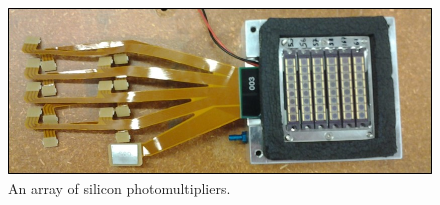 \begin{figure}
\centering
\includegraphics[width=\linewidth]{Figures/SiPM.jpg}
\caption{An array of silicon photomultipliers.}
\label{fig:SiPM}
\end{figure}




